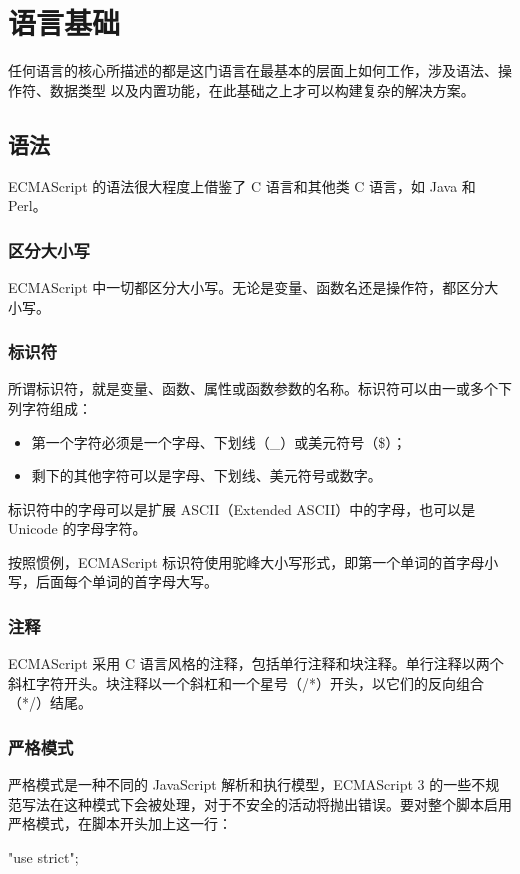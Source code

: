 \chapter{语言基础}
任何语言的核心所描述的都是这门语言在最基本的层面上如何工作，涉及语法、操作符、数据类型
以及内置功能，在此基础之上才可以构建复杂的解决方案。
\section{语法}
ECMAScript 的语法很大程度上借鉴了 C 语言和其他类 C 语言，如 Java 和 Perl。
\subsection{区分大小写}
ECMAScript 中一切都区分大小写。无论是变量、函数名还是操作符，都区分大小写。
\subsection{标识符}
所谓标识符，就是变量、函数、属性或函数参数的名称。标识符可以由一或多个下列字符组成：
\begin{itemize}
    \item 第一个字符必须是一个字母、下划线（\_）或美元符号（\$）；
    \item 剩下的其他字符可以是字母、下划线、美元符号或数字。
\end{itemize}
标识符中的字母可以是扩展 ASCII（Extended ASCII）中的字母，也可以是 Unicode 的字母字符。

按照惯例，ECMAScript 标识符使用驼峰大小写形式，即第一个单词的首字母小写，后面每个单词的首字母大写。


\subsection{注释}
ECMAScript 采用 C 语言风格的注释，包括单行注释和块注释。单行注释以两个斜杠字符开头。块注释以一个斜杠和一个星号（/*）开头，以它们的反向组合（*/）结尾。
\subsection{严格模式}
严格模式是一种不同的 JavaScript 解析和执行模型，ECMAScript 3 的一些不规范写法在这种模式下会被处理，对于不安全的活动将抛出错误。要对整个脚本启用严格模式，在脚本开头加上这一行：
\begin{js}
    "use strict";
\end{js}
